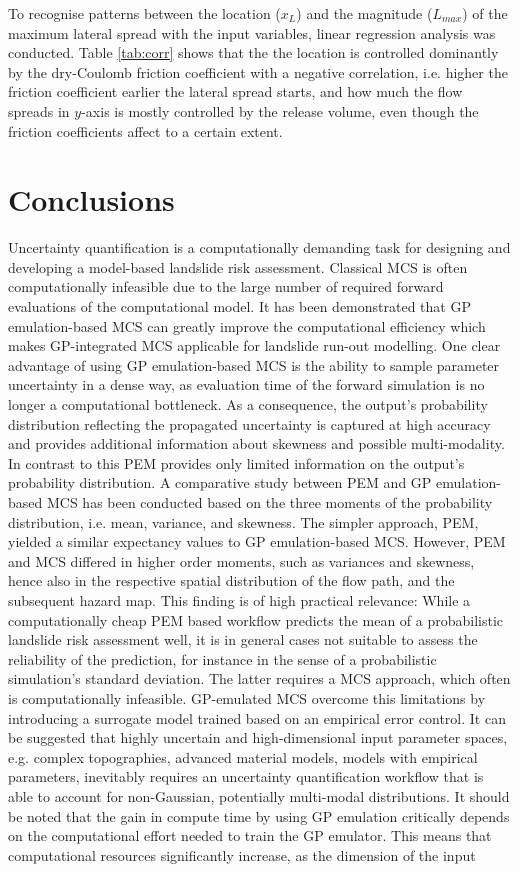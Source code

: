 \documentclass[utf8]{FrontiersinHarvard}
\begin{document}
To recognise patterns between the location ($x_{L}$) and the magnitude ($L_{max}$) of the maximum lateral spread with the input variables, linear regression analysis was conducted. Table \ref{tab:corr} shows that the the location is controlled dominantly by the dry-Coulomb friction coefficient with a negative correlation, i.e. higher the friction coefficient earlier the lateral spread starts, and how much the flow spreads in $y$-axis is mostly controlled by the release volume, even though the friction coefficients affect to a certain extent.

\section{Conclusions}

Uncertainty quantification is a computationally demanding task for designing and developing a model-based landslide risk assessment. Classical MCS is often computationally infeasible due to the large number of required forward evaluations of the computational model. It has been demonstrated that GP emulation-based MCS can greatly improve the computational efficiency which makes GP-integrated MCS applicable for landslide run-out modelling. One clear advantage of using GP emulation-based MCS is the ability to sample parameter uncertainty in a dense way, as evaluation time of the forward simulation is no longer a computational bottleneck. As a consequence, the output's probability distribution reflecting the propagated uncertainty is captured at high accuracy and provides additional information about skewness and possible multi-modality. In contrast to this PEM provides only limited information on the output's probability distribution. A comparative study between PEM and GP emulation-based MCS has been conducted based on the three moments of the probability distribution, i.e. mean, variance, and skewness. The simpler approach, PEM, yielded a similar expectancy values to GP emulation-based MCS. However, PEM and MCS differed in higher order moments, such as variances and skewness, hence also in the respective spatial distribution of the flow path, and the subsequent hazard map. This finding is of high practical relevance: While a computationally cheap PEM based workflow predicts the mean of a probabilistic landslide risk assessment well, it is in general cases not suitable to assess the reliability of the prediction, for instance in the sense of a probabilistic simulation's standard deviation. The latter requires a MCS approach, which often is computationally infeasible. GP-emulated MCS overcome this limitations by introducing a surrogate model trained based on an empirical error control. It can be suggested that highly uncertain and high-dimensional input parameter spaces, e.g. complex topographies, advanced material models, models with empirical parameters, inevitably requires an uncertainty quantification workflow that is able to account for non-Gaussian, potentially multi-modal distributions. It should be noted that the gain in compute time by using GP emulation critically depends on the computational effort needed to train the GP emulator. This means that computational resources significantly increase, as the dimension of the input 
\end{document}
